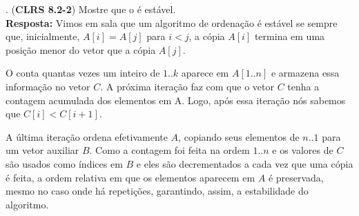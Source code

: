 
. (\textbf{CLRS 8.2-2}) Mostre que o  é estável.\\[6pt]

\textbf{Resposta:} Vimos em sala que um algoritmo de ordenação é estável se sempre que, inicialmente, $A[i] = A[j]$ para $i < j$, a cópia $A[i]$ termina em uma posição menor do vetor que a cópia $A[j]$. 

O  conta quantas vezes um inteiro de $1..k$ aparece em $A[1..n]$ e armazena essa informação no vetor $C$. A próxima iteração faz com que o vetor $C$ tenha a contagem acumulada dos elementos em A. Logo, após essa iteração nós sabemos que $C[i] < C[i + 1]$.

A última iteração ordena efetivamente $A$, copiando seus elementos de $n..1$ para um vetor auxiliar $B$. Como a contagem foi feita na ordem $1..n$ e os valores de $C$ são usados como índices em $B$ e eles são decrementados a cada vez que uma cópia é feita, a ordem relativa em que os elementos aparecem em $A$ é preservada, mesmo no caso onde há repetições, garantindo, assim, a estabilidade do algoritmo.\\[12pt]
